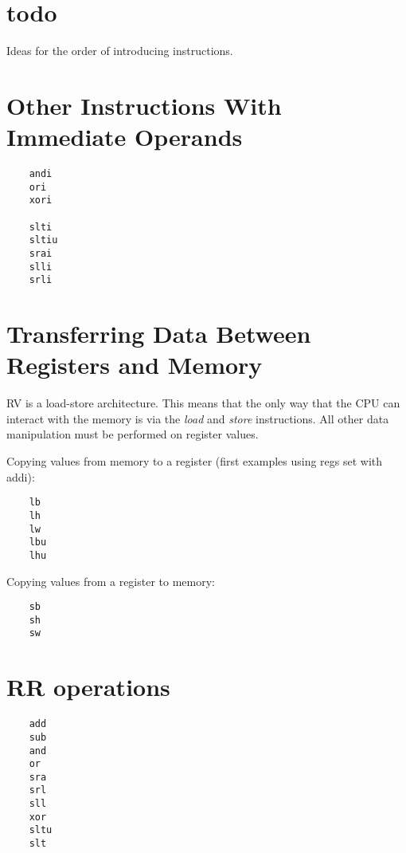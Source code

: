 \section{todo}

Ideas for the order of introducing instructions.


\section{Other Instructions With Immediate Operands}

\label{uguide:andi}
\label{uguide:ori}
\label{uguide:xori}
\label{uguide:slti}
\label{uguide:sltiu}
\label{uguide:srai}
\label{uguide:slli}
\label{uguide:srli}
\begin{verbatim}
    andi
    ori
    xori

    slti
    sltiu
    srai
    slli
    srli
\end{verbatim}


\section{Transferring Data Between Registers and Memory}

RV is a load-store architecture.  This means that the only way that the
CPU can interact with the memory is via the {\em load} and {\em store}
instructions.  All other data manipulation must be performed on register
values.

Copying values from memory to a register (first examples using regs set with addi):
\label{uguide:lb}
\label{uguide:lh}
\label{uguide:lw}
\label{uguide:lbu}
\label{uguide:lhu}
\begin{verbatim}
    lb
    lh
    lw
    lbu
    lhu
\end{verbatim}

Copying values from a register to memory:
\label{uguide:sb}
\label{uguide:sh}
\label{uguide:sw}
\begin{verbatim}
    sb
    sh
    sw
\end{verbatim}

\section{RR operations}
\label{uguide:add}
\label{uguide:sub}
\label{uguide:and}
\label{uguide:or}
\label{uguide:sra}
\label{uguide:srl}
\label{uguide:sll}
\label{uguide:xor}
\label{uguide:sltu}
\label{uguide:slt}
\begin{verbatim}
    add
    sub
    and
    or
    sra
    srl
    sll
    xor
    sltu
    slt
\end{verbatim}


